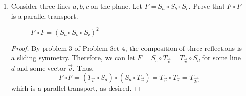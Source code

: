 \documentclass{article}
\begin{document}
\begin{enumerate}[label=(\alph*)]
    \begin{proof}
    A central symmetry about a point $O$ is equivalent to a rotation of $\pi$ radians around the same point $O$. Hence, we can consider three central symmetries, $R_{O_1}^{\pi}, R_{O_2}^{\pi}, R_{O_3}^{\pi}$. We know from lecture 2.2 that
    \[R_{O_1}^{\theta_1}\circ R_{O_2}^{\theta_2}=
    \begin{cases}
        R_{O_3}^{\theta_3} & \theta_1+\theta_2 \neq 2\pi k\\
        T_{\overrightarrow{v}} & \theta_1+\theta_2 = 2\pi k.
    \end{cases}\]
    \par Thus, $R_{O_1}^{\pi}\circ (R_{O_2}^{\pi}\circ R_{O_3}^{\pi})=R_{O_1}^{\pi}\circ T_{\overrightarrow{v}}$.
    \par We know from \ref{5a} that the composition of a central symmetry and a parallel transport is a central symmetry, so $R_{O_1}^{\pi}\circ T_{\overrightarrow{v}}=R_{O_4}^{\pi}$ for some fixed point $O_4$.
    \par Then for some point $p$, we have 
    \begin{align*}
        (R_{O_1}^{\pi}\circ (R_{O_2}^{\pi}\circ R_{O_3}^{\pi}))^2(p) 
        &=(R_{O_1}^{\pi}\circ T_{\overrightarrow{v}})^2(p)\\
        &=(R_{O_4}^{\pi})^2(p)\\
        &=\text{Id}(p)\\
        &=p.
    \end{align*}
    \end{proof}
    \item Consider three lines $a,b,c$ on the plane. Let $F=S_a\circ S_b\circ S_c$. Prove that $F\circ F$ is a parallel transport.
    
    \begin{figure}[ht]
        \centering
        
        \caption{$F\circ F=(S_a\circ S_b\circ S_c)^2$}
    \end{figure}
    
    \begin{proof}
    By problem 3 of Problem Set 4, the composition of three reflections is a sliding symmetry. Therefore, we can let $F=S_d\circ T_{\overrightarrow{v}}=T_{\overrightarrow{v}}\circ S_d$ for some line $d$ and some vector $\overrightarrow{v}$. Thus,
    \[F\circ F=(T_{\overrightarrow{v}}\circ S_d)\circ (S_d\circ T_{\overrightarrow{v}})=T_{\overrightarrow{v}}\circ T_{\overrightarrow{v}}=T_{\overrightarrow{2v}}\]
    which is a parallel transport, as desired.
    \end{proof}
\end{enumerate}
\end{document}
